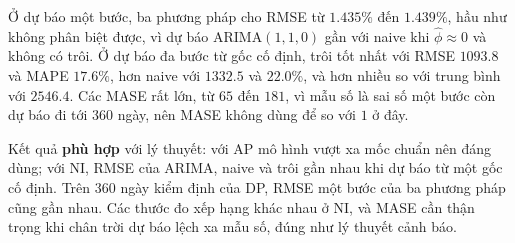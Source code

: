  Ở dự báo một bước, ba phương pháp cho RMSE từ $1.435\%$ đến $1.439\%$, hầu như không phân biệt được, vì dự báo ARIMA$(1,1,0)$ gần với naive khi $\hat\phi\approx0$ và không có trôi. Ở dự báo đa bước từ gốc cố định, trôi tốt nhất với RMSE $1093.8$ và MAPE $17.6\%$, hơn naive với $1332.5$ và $22.0\%$, và hơn nhiều so với trung bình với $2546.4$. Các MASE rất lớn, từ $65$ đến $181$, vì mẫu số là sai số một bước còn dự báo đi tới $360$ ngày, nên MASE không dùng để so với $1$ ở đây.

 Kết quả \textbf{phù hợp} với lý thuyết: với AP mô hình vượt xa mốc chuẩn nên đáng dùng; với NI, RMSE của ARIMA, naive và trôi gần nhau khi dự báo từ một gốc cố định. Trên 360 ngày kiểm định của DP, RMSE một bước của ba phương pháp cũng gần nhau. Các thước đo xếp hạng khác nhau ở NI, và MASE cần thận trọng khi chân trời dự báo lệch xa mẫu số, đúng như lý thuyết cảnh báo.

